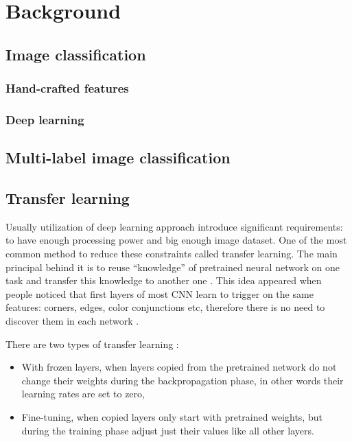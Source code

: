\chapter{Background}
\label{chap:background}

\section{Image classification}
\subsection{Hand-crafted features}
\subsection{Deep learning}


\section{Multi-label image classification}

\section{Transfer learning}
\label{sec:transfer-learning}

Usually utilization of deep learning approach introduce significant requirements: to have enough processing power and big enough image dataset. One of the most common method to reduce these constraints called transfer learning. The main principal behind it is to reuse ``knowledge'' of pretrained neural network on one task and transfer this knowledge to another one \cite{Pan2010TransferLearningSurvey, Oquab2014TransferringMidLevel}. This idea appeared when people noticed that first layers of most CNN learn to trigger on the same features: corners, edges, color conjunctions etc, therefore there is no need to discover them in each network \cite{Zeiler2014VisualizingNets}.

There are two types of transfer learning \cite{Yosinski2014HowTransferable}:
\begin{itemize}
    \item With frozen layers, when layers copied from the pretrained network do not change their weights during the backpropagation phase, in other words their learning rates are set to zero,
    \item Fine-tuning, when copied layers only start with pretrained weights, but during the training phase adjust just their values like all other layers.
\end{itemize}

